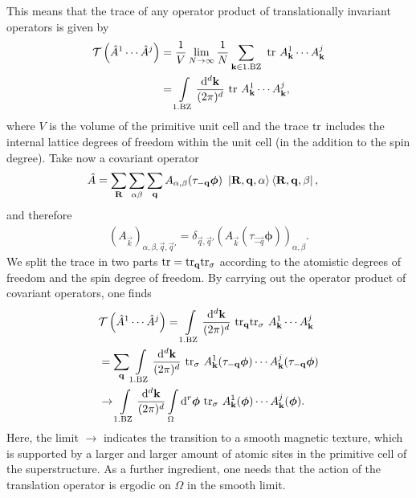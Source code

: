 \documentclass[
    10pt,
    aps,
    prb,
	longbibliography,
    twocolumn,
    floatfix,
    superscriptaddress,
]{revtex4-2}
\begin{document}
This means that the trace of any operator product of translationally invariant operators is given by
\begin{align}
\mathcal{T} \left( \hat{A}^1 \cdots  \hat{A}^j \right) &=
\frac{1}{V}
\lim\limits_{N\to \infty}	\frac{1}{N} \sum_{\mathbf{k} \in \mathrm{1.BZ}} ~ \mathrm{tr}~ A^1_{\mathbf{k}} \cdots A^j_{\mathbf{k}}
\notag \\
& =   \int\limits_{\mathrm{1.BZ}}  \frac{\mathrm{d}^d \mathbf{k}}{(2\pi)^d}~ \mathrm{tr}~ A^1_{\mathbf{k}} \cdots A^j_{\mathbf{k}},
\end{align}
where $V$ is the volume of the primitive unit cell and the trace $\mathrm{tr}$ includes the internal lattice degrees of freedom within the unit cell (in the addition to the spin degree).
Take now a covariant operator
\begin{align}
	\hat{A} &=
	\sum_{\mathbf{R}} \sum_{\alpha\beta}
	\sum_{\mathbf{q} }  A_{\alpha,\beta}( \tau_{\mathbf{-q}}\boldsymbol{\phi})~ \ket{\mathbf{R},\mathbf{q}, \alpha}\bra{\mathbf{R},\mathbf{q}, \beta} ,
\end{align}
and therefore
\begin{align}
	(A_{\vec{k}})_{ \alpha, \beta, \vec{q}, \vec{q}'}
	= \delta_{\vec{q}, \vec{q}'} (A_{\vec{k}}( \tau_\vec{-q}\boldsymbol{\phi}))_{ \alpha, \beta} . 
\end{align}
We split the trace in two parts $\mathrm{tr} = \mathrm{tr}_{\mathbf{q}} \mathrm{tr}_{\sigma} $ according to the atomistic degrees of freedom and the spin degree of freedom. 
By carrying out the operator product of covariant operators, one finds
\begin{align}
	&\mathcal{T} \left( \hat{A}^1 \cdots  \hat{A}^j \right)  =   \int\limits_{\mathrm{1.BZ}}\frac{\mathrm{d}^d \mathbf{k}}{(2\pi)^d}~ \mathrm{tr}_{\mathbf{q}} \mathrm{tr}_\sigma ~ A^1_{\mathbf{k}} \cdots A^j_{\mathbf{k}}
	\notag \\
	&=
 \sum_{\mathbf{q}}\int\limits_{\mathrm{1.BZ}} \frac{\mathrm{d}^d \mathbf{k}}{(2\pi)^d}~ \mathrm{tr}_\sigma ~ A^1_{\mathbf{k}}( \tau_{\mathbf{-q}}\boldsymbol{\phi})\cdots A^j_{\mathbf{k}}( \tau_{\mathbf{-q}}\boldsymbol{\phi})
	\notag \\
	&  
	\to
	\int\limits_{\mathrm{1.BZ}} \frac{\mathrm{d}^d \mathbf{k}}{(2\pi)^d} \int \limits_{\Omega}\mathrm{d}^r \boldsymbol{\phi}~ \mathrm{tr}_\sigma ~ A^1_{\mathbf{k}}( \boldsymbol{\phi})\cdots A^j_{\mathbf{k}}( \boldsymbol{\phi}) .
	\end{align}
Here, the limit $\to$ indicates the transition to a smooth magnetic texture, which is supported by a larger and larger amount of atomic sites in the primitive cell of the superstructure.
As a further ingredient, one needs that the action of the translation operator is ergodic on $\Omega$ in the smooth limit.
\end{document}
